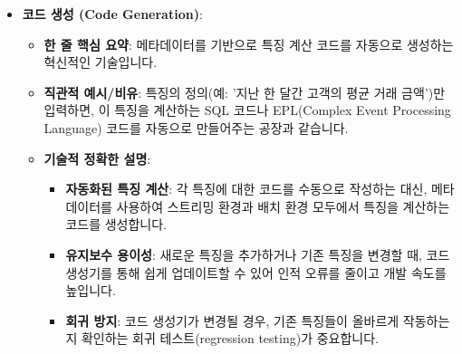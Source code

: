 \documentclass[11pt,a4paper]{article}
\begin{document}
\begin{itemize}
\begin{itemize}
\begin{itemize}
\begin{itemize}
\begin{itemize}
    \item \textbf{코드 생성 (Code Generation)}:
    \begin{itemize}
        \item \textbf{한 줄 핵심 요약}: 메타데이터를 기반으로 특징 계산 코드를 자동으로 생성하는 혁신적인 기술입니다.
        \item \textbf{직관적 예시/비유}: 특징의 정의(예: '지난 한 달간 고객의 평균 거래 금액')만 입력하면, 이 특징을 계산하는 SQL 코드나 EPL(Complex Event Processing Language) 코드를 자동으로 만들어주는 공장과 같습니다.
        \item \textbf{기술적 정확한 설명}:
        \begin{itemize}
            \item \textbf{자동화된 특징 계산}: 각 특징에 대한 코드를 수동으로 작성하는 대신, 메타데이터를 사용하여 스트리밍 환경과 배치 환경 모두에서 특징을 계산하는 코드를 생성합니다.
            \item \textbf{유지보수 용이성}: 새로운 특징을 추가하거나 기존 특징을 변경할 때, 코드 생성기를 통해 쉽게 업데이트할 수 있어 인적 오류를 줄이고 개발 속도를 높입니다.
            \item \textbf{회귀 방지}: 코드 생성기가 변경될 경우, 기존 특징들이 올바르게 작동하는지 확인하는 회귀 테스트(regression testing)가 중요합니다.
        \end{itemize}
    \end{itemize}


\end{itemize}
\end{itemize}
\end{itemize}
\end{itemize}
\end{itemize}
\end{document}
